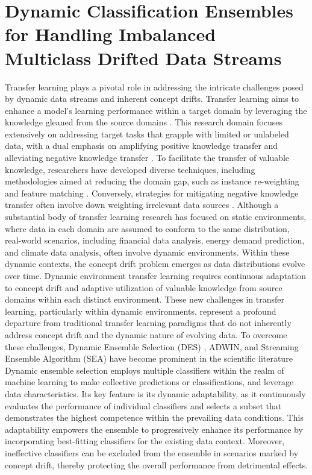 \chapter{Dynamic Classification Ensembles for Handling Imbalanced
Multiclass Drifted Data Streams}
\label{chapter:6_transfer_learning}

Transfer learning plays a pivotal role in addressing the intricate challenges posed by dynamic data streams and inherent concept drifts. Transfer learning aims to enhance a model's learning performance within a target domain by leveraging the knowledge gleaned from the source domains \cite{pan2009survey}\cite{wang2019characterizing}. This research domain focuses extensively on addressing target tasks that grapple with limited or unlabeled data, with a dual emphasis on amplifying positive knowledge transfer and alleviating negative knowledge transfer \cite{wang2019characterizing}. To facilitate the transfer of valuable knowledge, researchers have developed diverse techniques, including methodologies aimed at reducing the domain gap, such as instance re-weighting \cite{zadrozny2004learning}\cite{cortes2008sample}\cite{pan2010domain} and feature matching \cite{sun2016return}\cite{pan2010domain}. Conversely, strategies for mitigating negative knowledge transfer often involve down weighting irrelevant data sources \cite{wang2019characterizing}.
Although a substantial body of transfer learning research has focused on static environments, where data in each domain are assumed to conform to the same distribution, real-world scenarios, including financial data analysis, energy demand prediction, and climate data analysis, often involve dynamic environments. Within these dynamic contexts, the concept drift problem \cite{li2015learning}\cite{cao2019learning} emerges as data distributions evolve over time. Dynamic environment transfer learning requires continuous adaptation to concept drift and adaptive utilization of valuable knowledge from source domains within each distinct environment. These new challenges in transfer learning, particularly within dynamic environments, represent a profound departure from traditional transfer learning paradigms that do not inherently address concept drift and the dynamic nature of evolving data.
To overcome these challenges, Dynamic Ensemble Selection (DES) \cite{cruz2017meta}\cite{jackowski2014improved}\cite{kuncheva2000clustering}, ADWIN, and Streaming Ensemble Algorithm (SEA) have become prominent in the scientific literature \cite{gama2004learning}\cite{adams2023explainable}\cite{madkour2023historical} Dynamic ensemble selection employs multiple classifiers within the realm of machine learning to make collective predictions or classifications, and leverage data characteristics. Its key feature is its dynamic adaptability, as it continuously evaluates the performance of individual classifiers and selects a subset that demonstrates the highest competence within the prevailing data conditions. This adaptability empowers the ensemble to progressively enhance its performance by incorporating best-fitting classifiers for the existing data context. Moreover, ineffective classifiers can be excluded from the ensemble in scenarios marked by concept drift, thereby protecting the overall performance from detrimental effects.
